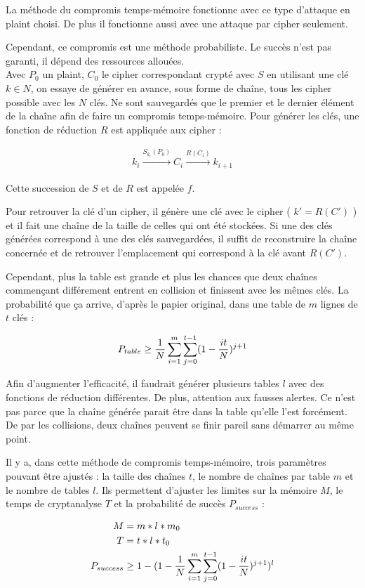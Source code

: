 	La méthode du compromis temps-mémoire fonctionne avec ce type d'attaque en \gls{plaint} choisi. De plus il fonctionne aussi avec une attaque par \gls{cipher} seulement.

	Cependant, ce compromis est une méthode probabiliste. Le succès n'est pas garanti, il dépend des ressources allouées.\\

	Avec $P_0$ un \gls{plaint}, $C_0$ le \gls{cipher} correspondant crypté avec $S$ en utilisant une clé $k \in N$, on essaye de générer en avance, sous forme de chaîne, tous les \gls{cipher} possible avec les $N$ clés. Ne sont sauvegardés que le premier et le dernier élément de la chaîne afin de faire un compromis temps-mémoire. Pour générer les clés, une fonction de réduction $R$ est appliquée aux \gls{cipher} :

	\begin{align*}
		k_i \overset{S_{k_i}(P_0)}{\longrightarrow} C_i \overset{R(C_i)}{\longrightarrow} k_{i+1}
	\end{align*}

	Cette succession de $S$ et de $R$ est appelée $f$.

	Pour retrouver la clé d'un \gls{cipher}, il génère une clé avec le \gls{cipher} ( $k' = R(C')$ ) et il fait une chaîne de la taille de celles qui ont été stockées. Si une des clés générées correspond à une des clés sauvegardées, il suffit de reconstruire la chaîne concernée et de retrouver l'emplacement qui correspond à la clé avant $R(C')$.

	Cependant, plus la table est grande et plus les chances que deux chaînes commençant différement entrent en collision et finissent avec les mêmes clés. La probabilité que ça arrive, d'après le papier original\cite{ehellman}, dans une table de $m$ lignes de $t$ clés :

	\begin{align*}
		P_{table} \ge{} \frac{1}{N} \sum\limits_{i=1}^{m}\sum\limits_{j=0}^{t-1} (1 - \frac{it}{N})^{j+1}
	\end{align*}

	Afin d'augmenter l'efficacité, il faudrait générer plusieurs tables $l$ avec des fonctions de réduction différentes. De plus, attention aux fausses alertes. Ce n'est pas parce que la chaîne générée parait être dans la table qu'elle l'est forcément. De par les collisions, deux chaînes peuvent se finir pareil sans démarrer au même point.

	Il y a, dans cette méthode de compromis temps-mémoire, trois paramètres pouvant être ajustés : la taille des chaînes $t$, le nombre de chaînes par table $m$ et le nombre de tables $l$. Ils permettent d'ajuster les limites sur la mémoire $M$, le temps de cryptanalyse $T$ et la probabilité de succès $P_{success}$\cite{Oech03} :

	\begin{align*}
		M &= m*l*m_0\\
		T &= t*l*t_0\\
		P_{success} &\ge{} 1 - (1 - \frac{1}{N} \sum\limits_{i=1}^{m}\sum\limits_{j=0}^{t-1} (1 - \frac{it}{N})^{j+1})^l
	\end{align*}

\endinput{}
